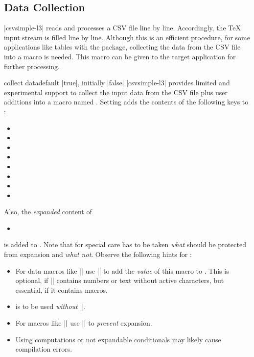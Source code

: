 \documentclass[a4paper,11pt]{ltxdoc}
\begin{document}
\clearpage
\subsection{Data Collection}\label{sec:datacollection}

|csvsimple-l3| reads and processes a CSV file line by line. Accordingly, the \TeX{}
input stream is filled line by line.
Although this is an efficient procedure, for some applications like tables with
the  package, collecting the data from the CSV file into a macro is needed.
This macro can be given to the target application for further processing.


\begin{docCsvKey}[][doc new=2021-07-06]{collect data}{}{default |true|, initially |false|}
|csvsimple-l3| provides limited and experimental support to collect the input data
from the CSV file plus user additions into a macro named .
Setting  adds the contents of the following keys
to :
\begin{itemize}
\item{}
\item{}
\item{}
\item{}
\item{}
\item{}
\item{}
\item{}
\end{itemize}
Also, the \emph{expanded} content of
\begin{itemize}
\item{}
\end{itemize}
is added to .
Note that for  special care has to be taken
\emph{what} should be protected from expansion and \emph{what not}.
Observe the following hints for :
\begin{itemize}
\item For data macros like |\csvcoli| use |\csvexpval\csvcoli| to add
  the \emph{value} of this macro to .
  This is optional, if |\csvcoli| contains numbers or text without active
  characters, but essential, if it contains macros.
\item {} is to be used \emph{without} |\csvexpval|.
\item For macros like |\textbf| use  |\csvexpnot\textbf| to \emph{prevent}
  expansion.
\item Using computations or not expandable conditionals may likely cause
  compilation errors.
\end{itemize}


\end{docCsvKey}
\end{document}
